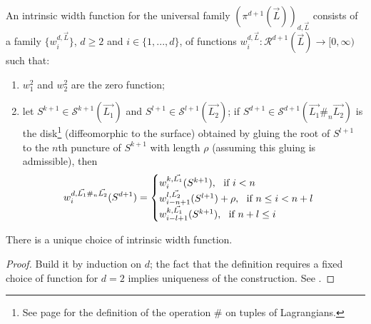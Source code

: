 	\begin{dfn}
		An intrinsic width function for the universal family $(\pi^{d+1}(\vec{L}))_{d,\vec{L}}$ consists of a family $\{w_i^{d,\vec{L}}\}$, $d\geq 2$ and $i\in \{1,...,d\}$, of functions $w_i^{d,\vec{L}}\colon\mathcal{R}^{d+1}(\vec{L})\rightarrow [0,\infty)$ such that:
		\begin{enumerate}
			\item $w_1^2$ and $w_2^2$ are the zero function;
			\item let $S^{k+1}\in \mathcal{S}^{k+1}(\vec{L_1})$ and $S^{l+1}\in \mathcal{S}^{l+1}(\vec{L_2})$; if $S^{d+1}\in \mathcal{S}^{d+1}(\vec{L_1}\#_n\vec{L_2})$ is the disk\footnote{See page \pageref{cancelletto} for the definition of the operation $\#$ on tuples of Lagrangians.} (diffeomorphic to the surface) obtained by gluing the root of $S^{l+1}$ to the $n$th puncture of $S^{k+1}$ with length $\rho$ (assuming this gluing is admissible), then $$w_i^{d,\vec{L_1}\#_n\vec{L_2}}(S^{d+1})=\begin{cases} w_i^{k,\vec{L_1}}(S^{k+1}), \ \textnormal{ if } i<n\\ w_{i-n+1}^{l,\vec{L_2}}(S^{l+1})+\rho, \ \textnormal{ if } n\leq i<n+l\\ w_{i-l+1}^{k,\vec{L_1}}(S^{k+1}), \ \textnormal{ if }n+l\leq i\end{cases}$$
		\end{enumerate}
	\end{dfn}
	\begin{lemma}
		There is a unique choice of intrinsic width function.
	\end{lemma}
	\begin{proof}
		Build it by induction on $d$; the fact that the definition requires a fixed choice of function for $d=2$ implies uniqueness of the construction. See \cite{Sylvan2019OnCategories}.
	\end{proof}
	
